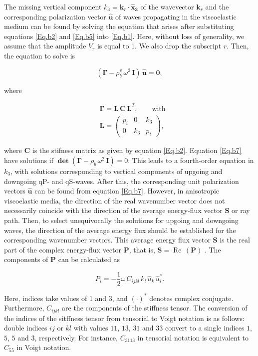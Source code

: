 \documentclass[draft]{agujournal2019}
\renewcommand{\Re}{\operatorname{Re} }
\begin{document}
The missing vertical component  $k_3=\bm{k}_r\cdot \bm{\hat{x}_3}$ of the wavevector $\bm{k}_r$ and the corresponding polarization vector $\bm{\hat{u}}$ of waves propagating in the viscoelastic medium can be found by solving the equation that arises after substituting equations \eqref{Eq.b2} and \eqref{Eq.b5} into \eqref{Eq.b1}. Here, without loss of generality, we assume that the amplitude $V_r$ is equal to 1. We also drop the subscript $r$. Then, the equation to solve is
\begin{linenomath*}
\begin{equation}\label{Eq.b7}
(\bm{\Gamma} - \rho_b^v \, \omega^2 \,\bm{I}) \,\bm{\hat{u}} = \bm{0},
\end{equation}
\end{linenomath*}
where
\begin{linenomath*}
\begin{equation}\label{Eq.b8}
\begin{split}
&\bm{\Gamma}=\bm{L}\,\bm{C}\,\bm{L}^T, \qquad  \text{with}  \\
&\bm{L}=\begin{pmatrix}  p_i & 0 & k_3\\ 0 & k_3 & p_i \end{pmatrix},
\end{split}
\end{equation}
\end{linenomath*}
where $\bm{C}$ is the stifness matrix as given by equation \eqref{Eq.b2}. Equation \eqref{Eq.b7} have solutions if $\bm{\det}(\bm{\Gamma} - \rho_b \, \omega^2 \,\bm{I}) = 0 $. This leads to a fourth-order equation in $k_3$, with solutions corresponding to vertical components of upgoing and downgoing qP- and qS-waves. After this, the corresponding unit polarization vectors $\bm{\hat{u}}$ can be found from equation \eqref{Eq.b7}. However, in anisotropic viscoelastic media, the direction of the real wavenumber vector  does not necessarily coincide with the direction of the average energy-flux vector $\bm{S}$ or ray path. Then, to select unequivocally the solutions for upgoing and downgoing waves, the  direction of the average energy flux should be established for the corresponding wavenumber vectors. This average energy flux vector $\bm{S}$ is the real part of the complex energy-flux vector $\bm{P}$, that is, $\bm{S} = \Re\,(\bm{P})$ \cite{Carcione1993, Cerveny2006}. The components of $\bm{P}$  can be calculated as \cite{carcione2007wave}
\begin{linenomath*}
\begin{equation}\label{Eq.b9}
P_i = -\frac{1}{2} \omega \, C_{ijkl}\, k_l\,\hat{u}_k \,\hat{u}_i^*.
\end{equation}
\end{linenomath*}
Here, indices take values of 1 and 3, and $\left(\cdot\right)^*$ denotes complex conjugate.
Furthermore, $C_{ijkl}$ are the components of the stiffness tensor. The conversion of the indices of the sitffness tensor from tensorial to  Voigt notation is as follows: double indices  $ij$ or $kl$ with values $11$, $13$, $31$ and $33$ convert to a single indices $1$, $5$, $5$ and $3$, respectively. For instance, $C_{3113}$ in tensorial notation is equivalent to $C_{55}$ in Voigt notation.
\end{document}
